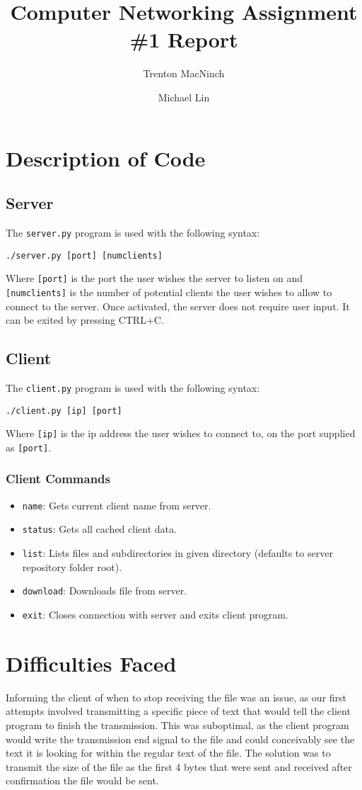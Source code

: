 \documentclass{article}
\title{\textbf{Computer Networking Assignment \#1 Report}}
\author{Trenton MacNinch \and Michael Lin}
\begin{document}
\maketitle

\section{Description of Code}
\subsection{Server}
The \texttt{server.py} program is used with the following syntax:

\texttt{./server.py [port] [numclients]}

Where \texttt{[port]} is the port the user wishes the server to listen on and \texttt{[numclients]} is the number of potential clients the user wishes to allow to connect to the server. Once activated, the server does not require user input. It can be exited by pressing CTRL+C.

\subsection{Client}
The \texttt{client.py} program is used with the following syntax:

\texttt{./client.py [ip] [port]}

Where \texttt{[ip]} is the ip address the user wishes to connect to, on the port supplied as \texttt{[port]}.

\subsubsection{Client Commands}
\begin{itemize}
	\item \texttt{name}: Gets current client name from server.
	\item \texttt{status}: Gets all cached client data.
	\item \texttt{list}: Lists files and subdirectories in given directory (defaults to server repository folder root).
	\item \texttt{download}: Downloads file from server.
	\item \texttt{exit}: Closes connection with server and exits client program.
\end{itemize}

\section{Difficulties Faced}
Informing the client of when to stop receiving the file was an issue, as our first attempts involved transmitting a specific piece of text that would tell the client program to finish the transmission. This was suboptimal, as the client program would write the transmission end signal to the file and could conceivably see the text it is looking for within the regular text of the file. The solution was to transmit the size of the file as the first 4 bytes that were sent and received after confirmation the file would be sent.
\end{document}
